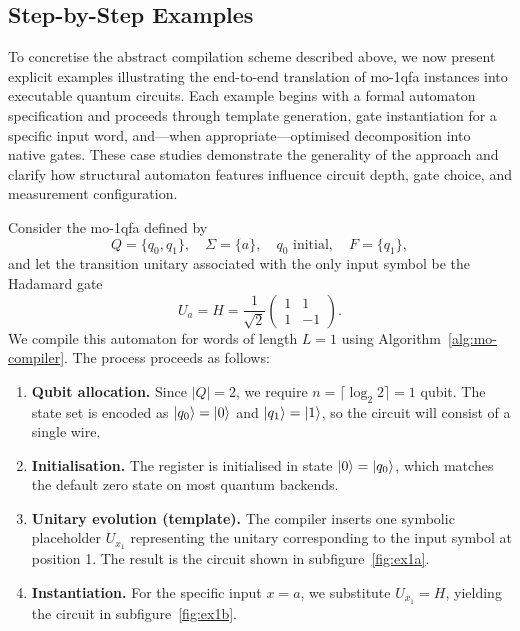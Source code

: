\subsection{Step-by-Step Examples}
To concretise the abstract compilation scheme described above, we now present explicit examples illustrating the end-to-end translation of \gls{mo-1qfa} instances into executable quantum circuits. Each example begins with a formal automaton specification and proceeds through template generation, gate instantiation for a specific input word, and—when appropriate—optimised decomposition into native gates. These case studies demonstrate the generality of the approach and clarify how structural automaton features influence circuit depth, gate choice, and measurement configuration.
\begin{example}
\label{ex:moqfa-single-letter}
Consider the \gls{mo-1qfa} defined by
\[
Q = \{q_0, q_1\}, \quad \Sigma = \{a\}, \quad q_0 \text{ initial}, \quad F = \{q_1\},
\]
and let the transition unitary associated with the only input symbol be the Hadamard gate
\[
U_a = H = \frac{1}{\sqrt{2}}
\begin{pmatrix}
1 & 1 \\
1 & -1
\end{pmatrix}.
\]
We compile this automaton for words of length $L = 1$ using Algorithm~\ref{alg:mo-compiler}. The process proceeds as follows:

\begin{enumerate}
\item \textbf{Qubit allocation.} Since $|Q| = 2$, we require $n = \lceil \log_2 2 \rceil = 1$ qubit. The state set is encoded as $\ket{q_0} = \ket{0}$ and $\ket{q_1} = \ket{1}$, so the circuit will consist of a single wire.

\item \textbf{Initialisation.} The register is initialised in state $\ket{0} = \ket{q_0}$, which matches the default zero state on most quantum backends.

\item \textbf{Unitary evolution (template).} The compiler inserts one symbolic placeholder $\boxed{U_{x_1}}$ representing the unitary corresponding to the input symbol at position 1. The result is the circuit shown in subfigure~\ref{fig:ex1a}.

\item \textbf{Instantiation.} For the specific input $x = a$, we substitute $U_{x_1} = H$, yielding the circuit in subfigure~\ref{fig:ex1b}.


\end{enumerate}
\end{example}
